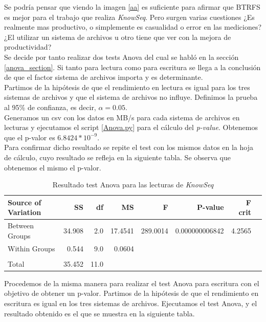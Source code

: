 Se podría pensar que viendo la imagen \ref{aa} es suficiente para afirmar que BTRFS es mejor para el trabajo que realiza \textit{KnowSeq}. Pero surgen varias cuestiones ¿Es realmente mas productivo, o simplemente es casualidad o error en las mediciones?  ¿El utilizar un sistema de archivos u otro tiene que ver con la mejora de productividad?\\

Se decide por tanto realizar dos tests Anova del cual se habló en la sección \ref{anova_section}. Si tanto para lectura como para escritura se llega a la conclusión de que el factor sistema de archivos importa y es determinante.\\

Partimos de la hipótesis de que el rendimiento en lectura es igual para los tres sistemas de archivos y que el sistema de archivos no influye. Definimos la prueba al 95\% de confianza, es decir, $\alpha = 0.05$.\\

Generamos un csv con los datos en MB/s para cada sistema de archivos en lecturas y ejecutamos el script \ref{Anova.py} para el cálculo del \textit{p-value}. Obtenemos que el p-valor es $6.8424*10^{-9}$.\\

Para confirmar dicho resultado se repite el test con los mismos datos en la hoja de cálculo, cuyo resultado se refleja en la siguiente tabla. Se observa que obtenemos el mismo el p-valor. 

\begin{table}[!htp]\centering
\scriptsize
\begin{tabular}{lrrrrrrr}\toprule
Source of Variation &SS &df &MS &F &P-value &F crit \\\midrule
Between Groups &34.908 &2.0 &17.4541 &289.0014 &0.000000006842 &4.2565 \\
Within Groups &0.544 &9.0 &0.0604 & & & \\
& & & & & & \\
Total &35.452 &11.0 & & & & \\
\bottomrule
\end{tabular}
\caption{Resultado test Anova para las lecturas de \textit{KnowSeq}}\label{tab: }
\end{table}

Procedemos de la misma manera para realizar el test Anova para escritura con el objetivo de obtener un p-valor. Partimos de la hipótesis de que el rendimiento en escritura es igual en los tres sistemas de archivos. Ejecutamos el test Anova, y el resultado obtenido es el que se muestra en la siguiente tabla.

